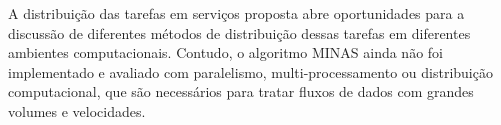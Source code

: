 A distribuição das tarefas em serviços proposta abre oportunidades para a
discussão de diferentes métodos de distribuição dessas tarefas em diferentes
ambientes computacionais.
Contudo, o algoritmo MINAS ainda não foi implementado e avaliado com
paralelismo, multi-processamento ou distribuição computacional, que são
necessários para tratar fluxos de dados com grandes volumes e velocidades.




\newcommand{\stream}{\emph{data stream}\xspace}
\newcommand{\streams}{\emph{data streams}\xspace}
\newcommand{\streamMining}{\emph{data stream mining}\xspace}


